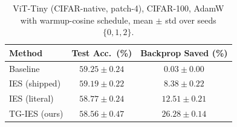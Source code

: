\documentclass{article}
\newcommand{\win}[1]{\cellcolor{tgwin}#1}
\newcommand{\lose}[1]{\cellcolor{tglose}#1}
\theoremstyle{plain}
\theoremstyle{definition}
\theoremstyle{remark}
\begin{document}
\begin{table}[h]
\caption{ViT-Tiny (CIFAR-native, patch-4), CIFAR-100, AdamW with warmup-cosine schedule, mean $\pm$ std over seeds $\{0,1,2\}$.}
\label{tab:vit100}
\vskip 0.1in
\begin{center}
\begin{small}
\begin{tabular}{lcc}
\toprule
Method & Test Acc.\ (\%) & Backprop Saved (\%) \\
\midrule
Baseline & $59.25\pm0.24$ & $0.03\pm0.00$ \\
IES (shipped) & $59.19\pm0.22$ & $8.38\pm0.22$ \\
IES (literal) & $58.77\pm0.24$ & $12.51\pm0.21$ \\
\win{TG-IES (ours)} & \lose{$58.56\pm0.47$} & \win{$\mathbf{26.28\pm0.14}$} \\
\bottomrule
\end{tabular}
\end{small}
\end{center}
\vskip -0.1in
\end{table}
\end{document}
